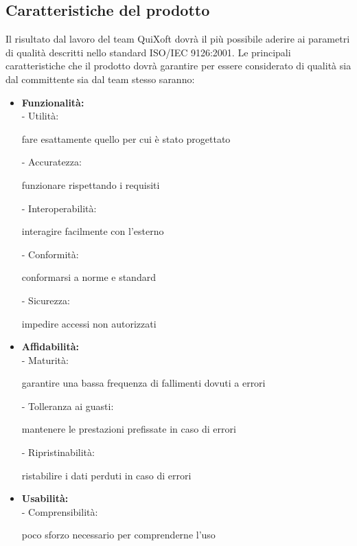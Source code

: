 \documentclass[11pt,a4paper]{article}
\begin{document}
\subsection{Caratteristiche del prodotto}
Il risultato dal lavoro del team QuiXoft dovrà il più possibile aderire ai parametri di qualità descritti nello standard ISO/IEC 9126:2001. Le principali caratteristiche che il prodotto dovrà garantire per essere considerato di qualità sia dal committente sia dal team stesso saranno:
\begin{itemize}
	\item \textbf{Funzionalità:} \\
		- Utilità: \begin{small}fare esattamente quello per cui è stato progettato\\\end{small}
		- Accuratezza: \begin{small}funzionare rispettando i requisiti\\\end{small}
		- Interoperabilità: \begin{small}interagire facilmente con l'esterno\\\end{small}
		- Conformità: \begin{small}conformarsi a norme e standard\\\end{small}
		- Sicurezza: \begin{small}impedire accessi non autorizzati\end{small}
	\item \textbf{Affidabilità:} \\
		- Maturità: \begin{small}garantire una bassa frequenza di fallimenti dovuti a errori\\\end{small}
		- Tolleranza ai guasti: \begin{small}mantenere le prestazioni prefissate in caso di errori\\\end{small}
		- Ripristinabilità: \begin{small}ristabilire i dati perduti in caso di errori\end{small}
	\item \textbf{Usabilità:} \\
		- Comprensibilità: \begin{small}poco sforzo necessario per comprenderne l'uso \\\end{small}

\end{itemize}
\end{document}
